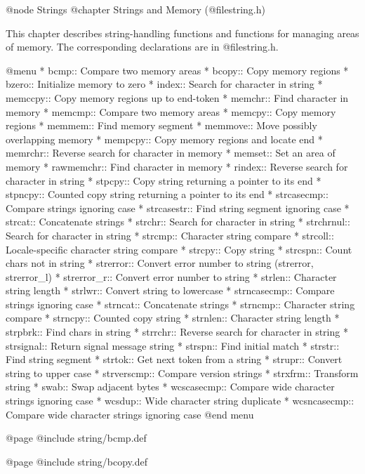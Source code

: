 @node Strings
@chapter Strings and Memory (@file{string.h})

This chapter describes string-handling functions and functions for
managing areas of memory.  The corresponding declarations are in
@file{string.h}.

@menu
* bcmp::        Compare two memory areas
* bcopy::       Copy memory regions
* bzero::       Initialize memory to zero
* index::       Search for character in string
* memccpy::     Copy memory regions up to end-token
* memchr::      Find character in memory
* memcmp::      Compare two memory areas
* memcpy::      Copy memory regions
* memmem::      Find memory segment
* memmove::     Move possibly overlapping memory
* mempcpy::	Copy memory regions and locate end
* memrchr::     Reverse search for character in memory
* memset::      Set an area of memory
* rawmemchr::   Find character in memory
* rindex::      Reverse search for character in string
* stpcpy::      Copy string returning a pointer to its end
* stpncpy::     Counted copy string returning a pointer to its end
* strcasecmp::	Compare strings ignoring case
* strcasestr::	Find string segment ignoring case
* strcat::      Concatenate strings
* strchr::      Search for character in string
* strchrnul::   Search for character in string
* strcmp::      Character string compare
* strcoll::     Locale-specific character string compare
* strcpy::      Copy string
* strcspn::     Count chars not in string
* strerror::    Convert error number to string (strerror, strerror_l)
* strerror_r::  Convert error number to string
* strlen::      Character string length
* strlwr::	Convert string to lowercase
* strncasecmp::	Compare strings ignoring case
* strncat::     Concatenate strings
* strncmp::     Character string compare
* strncpy::     Counted copy string
* strnlen::     Character string length
* strpbrk::     Find chars in string
* strrchr::     Reverse search for character in string
* strsignal::	Return signal message string
* strspn::      Find initial match
* strstr::      Find string segment
* strtok::      Get next token from a string
* strupr::	Convert string to upper case
* strverscmp::  Compare version strings
* strxfrm::     Transform string
* swab::        Swap adjacent bytes
* wcscasecmp::  Compare wide character strings ignoring case
* wcsdup::      Wide character string duplicate
* wcsncasecmp:: Compare wide character strings ignoring case
@end menu

@page
@include string/bcmp.def

@page
@include string/bcopy.def


